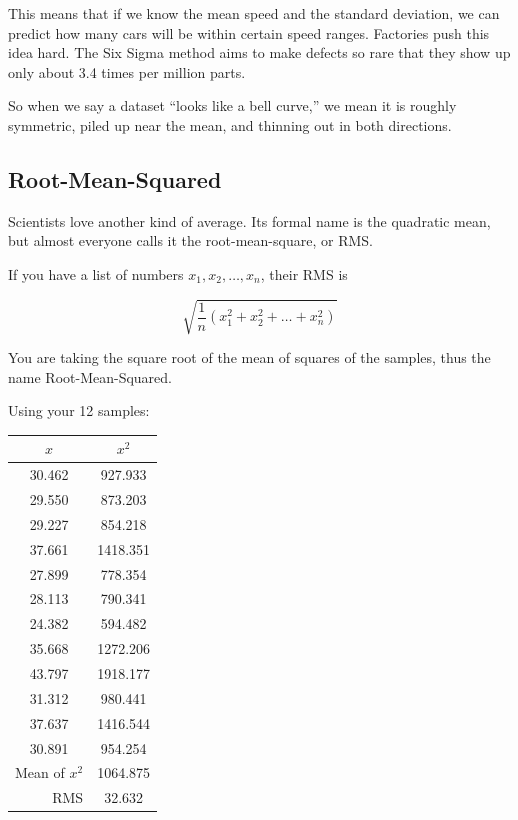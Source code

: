 This means that if we know the mean speed and the standard deviation, we can predict how many cars will be within certain speed ranges. Factories push this idea hard. The Six Sigma method aims to make defects so rare that they show up only about 3.4 times per million parts.

So when we say a dataset ``looks like a bell curve,'' we mean it is roughly symmetric, piled up near the mean, and thinning out in both directions.


\subsection{Root-Mean-Squared}

Scientists love another kind of average. Its formal name is the
quadratic mean, but almost everyone calls it the root-mean-square, or
RMS.

\begin{mdframed}[style=important, frametitle={Definition of RMS}]

If you have a list of numbers $x_1, x_2, \ldots, x_n$, their RMS
is   

$$\sqrt{\frac{1}{n}\left( x_1^2 + x_2^2 + \ldots + x_n^2 \right)}$$

\end{mdframed}

You are taking the square root of the mean of squares of the samples,
thus the name Root-Mean-Squared.

Using your 12 samples:

\begin{tabular}{c |  c}
  $x$ & $x^2$ \\
  \hline
30.462 & 927.933 \\
29.550 & 873.203\\
29.227 & 854.218\\
37.661 & 1418.351\\
27.899 & 778.354\\
28.113 & 790.341\\
24.382 & 594.482\\
35.668 & 1272.206\\
43.797 & 1918.177\\
31.312 & 980.441\\
37.637 & 1416.544\\
30.891 & 954.254\\
\hline
\multicolumn{1}{r}{Mean of $x^2$} & {1064.875}\\
\multicolumn{1}{r}{RMS} & {32.632}
  \end{tabular}

